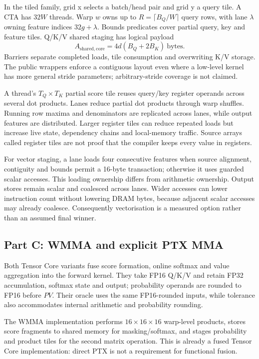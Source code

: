 \documentclass[11pt,a4paper]{article}
\begin{document}
In the tiled family, grid x selects a batch/head pair and grid y a query tile.
A CTA has $32W$ threads. Warp $w$ owns up to $R=\lceil B_Q/W\rceil$ query rows,
with lane $\lambda$ owning feature indices $32g+\lambda$. Bounds predicates cover
partial query, key and feature tiles. Q/K/V shared staging has logical payload
\begin{equation}
 A_{\mathrm{shared,core}}=4d(B_Q+2B_K)\ \text{bytes}.
 \label{eq:shared}
\end{equation}
Barriers separate completed loads, tile consumption and overwriting K/V storage.
The public wrappers enforce a contiguous layout even where a low-level kernel
has more general stride parameters; arbitrary-stride coverage is not claimed.

A thread's $T_Q\times T_K$ partial score tile reuses query/key register operands
across several dot products. Lanes reduce partial dot products through warp
shuffles. Running row maxima and denominators are replicated across lanes,
while output features are distributed. Larger register tiles can reduce repeated
loads but increase live state, dependency chains and local-memory traffic.
Source arrays called register tiles are not proof that the compiler keeps every
value in registers.

For vector staging, a lane loads four consecutive features when source alignment,
contiguity and bounds permit a 16-byte transaction; otherwise it uses guarded
scalar accesses. This loading ownership differs from arithmetic ownership.
Output stores remain scalar and coalesced across lanes. Wider accesses can lower
instruction count without lowering DRAM bytes, because adjacent scalar accesses
may already coalesce. Consequently vectorisation is a measured option rather
than an assumed final winner.

\subsection{Part C: WMMA and explicit PTX MMA}
Both Tensor Core variants fuse score formation, online softmax and value
aggregation into the forward kernel. They take FP16 Q/K/V and retain FP32
accumulation, softmax state and output; probability operands are rounded to FP16
before $PV$. Their oracle uses the same FP16-rounded inputs, while tolerance
also accommodates internal arithmetic and probability rounding.

The WMMA implementation performs $16\times16\times16$ warp-level products,
stores score fragments to shared memory for masking/softmax, and stages probability
and product tiles for the second matrix operation. This is already a fused Tensor
Core implementation: direct PTX is not a requirement for functional fusion.
\end{document}
